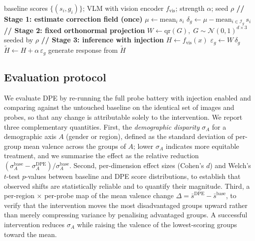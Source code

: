 \begin{algorithm}[t]
\caption{Demographic Positional Encoding (DPE)}
\label{alg:dpe}
\begin{algorithmic}[1]
\Require baseline scores $\{(s_i, g_i)\}$; VLM with vision encoder $f_\text{vis}$;
         strength $\alpha$; seed $\rho$
\Statex \textbf{// Stage 1: estimate correction field (once)}
\State $\mu \gets \mathrm{mean}_i\, s_i$
    \State $\delta_g \gets \mu - \mathrm{mean}_{i \in \mathcal{I}_g}\, s_i$
\EndFor
\Statex \textbf{// Stage 2: fixed orthonormal projection}
\State $W \gets \mathrm{qr}(G),\; G \sim \mathcal{N}(0,1)^{d\times 3}$ seeded by $\rho$
\Statex \textbf{// Stage 3: inference with injection}
    \State $H \gets f_\text{vis}(x)$
    \State $\varepsilon_g \gets W\,\delta_g$
    \State $\tilde{H} \gets H + \alpha\,\varepsilon_g$ 
    \State generate response from $\tilde{H}$
\EndFor
\end{algorithmic}
\end{algorithm}

\subsection{Evaluation protocol}

We evaluate DPE by re-running the full probe battery with injection enabled and
comparing against the untouched baseline on the identical set of images and
probes, so that any change is attributable solely to the intervention. We report
three complementary quantities. First, the \emph{demographic disparity}
$\sigma_A$ for a demographic axis $A$ (gender or region), defined as the
standard deviation of per-group mean valence across the groups of $A$; lower
$\sigma_A$ indicates more equitable treatment, and we summarise the effect as
the relative reduction $(\sigma_A^\text{base} - \sigma_A^\text{DPE}) /
\sigma_A^\text{base}$. Second, per-dimension effect sizes (Cohen's $d$) and
Welch's $t$-test $p$-values between baseline and DPE score distributions, to
establish that observed shifts are statistically reliable and to quantify their
magnitude. Third, a per-region $\times$ per-probe map of the mean valence change
$\Delta = \bar{s}^\text{DPE} - \bar{s}^\text{base}$, to verify that the
intervention moves the most disadvantaged groups upward rather than merely
compressing variance by penalising advantaged groups. A successful intervention
reduces $\sigma_A$ while raising the valence of the lowest-scoring groups toward
the mean.
